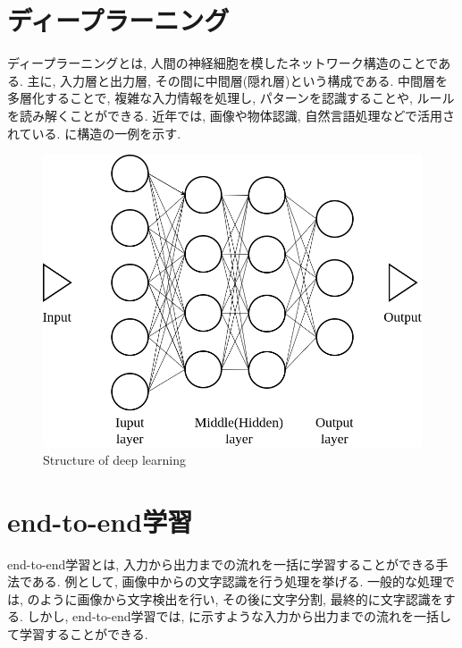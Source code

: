 
\section{ディープラーニング}
ディープラーニングとは, 人間の神経細胞を模したネットワーク構造のことである. 主に, 入力層と出力層, その間に中間層(隠れ層)という構成である. 中間層を多層化することで, 複雑な入力情報を処理し, パターンを認識することや, ルールを読み解くことができる. 近年では, 画像や物体認識, 自然言語処理などで活用されている. に構造の一例を示す. 

\vspace{30mm}

\begin{figure}[h]
     \centering
     \includegraphics[keepaspectratio, scale=0.3]
     {images/dl.png}
     \caption{Structure of deep learning}
     \label{Fig:dl}
     \end{figure}

\newpage
\section{end-to-end学習}
end-to-end学習とは, 入力から出力までの流れを一括に学習することができる手法である. 例として, 画像中からの文字認識を行う処理を挙げる. 一般的な処理では, のように画像から文字検出を行い, その後に文字分割, 最終的に文字認識をする. しかし, end-to-end学習では, に示すような入力から出力までの流れを一括して学習することができる. 

\vspace{35mm}

